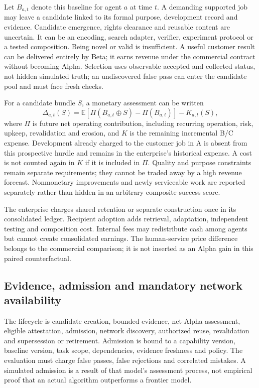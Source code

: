 \documentclass[11pt,a4paper]{article}
\begin{document}
Let $B_{a,t}$ denote this baseline for agent $a$ at time $t$. A demanding supported job may leave a candidate linked to its formal purpose, development record and evidence. Candidate emergence, rights clearance and reusable content are uncertain. It can be an encoding, search adapter, verifier, experiment protocol or a tested composition. Being novel or valid is insufficient. A useful customer result can be delivered entirely by Beta; it earns revenue under the commercial contract without becoming Alpha. Selection uses observable accepted and collected status, not hidden simulated truth; an undiscovered false pass can enter the candidate pool and must face fresh checks.

For a candidate bundle $S$, a monetary assessment can be written
\begin{equation}
 \Delta_{a,t}(S)=\mathbb{E}\!\left[\Pi(B_{a,t}\oplus S)-\Pi(B_{a,t})\right]-K_{a,t}(S),
\end{equation}
where $\Pi$ is future net operating contribution, including recurring operation, risk, upkeep, revalidation and erosion, and $K$ is the remaining incremental B/C expense. Development already charged to the customer job in A is absent from this prospective hurdle and remains in the enterprise's historical expense. A cost is not counted again in $K$ if it is included in $\Pi$. Quality and purpose constraints remain separate requirements; they cannot be traded away by a high revenue forecast. Nonmonetary improvements and newly serviceable work are reported separately rather than hidden in an arbitrary composite success score.

The enterprise charges shared retention or separate construction once in its consolidated ledger. Recipient adoption adds retrieval, adaptation, independent testing and composition cost. Internal fees may redistribute cash among agents but cannot create consolidated earnings. The human-service price difference belongs to the commercial comparison; it is not inserted as an Alpha gain in this paired counterfactual.

\subsection{Evidence, admission and mandatory network availability}

The lifecycle is candidate creation, bounded evidence, net-Alpha assessment, eligible attestation, admission, network discovery, authorized reuse, revalidation and supersession or retirement. Admission is bound to a capability version, baseline version, task scope, dependencies, evidence freshness and policy. The evaluation must charge false passes, false rejections and correlated mistakes. A simulated admission is a result of that model's assessment process, not empirical proof that an actual algorithm outperforms a frontier model.
\end{document}
